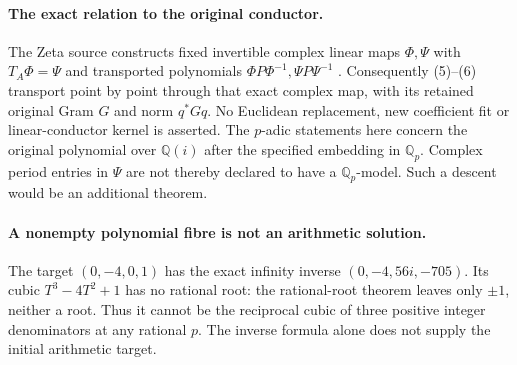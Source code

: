 \paragraph{The exact relation to the original conductor.}
The Zeta source constructs fixed invertible complex linear maps $\Phi,\Psi$
with $T_A\Phi=\Psi$ and transported polynomials
$\Phi P\Phi^{-1},\Psi P\Psi^{-1}$ \cite[FC32--35]{Zeta}.
Consequently (5)--(6) transport point by point through that exact complex map,
with its retained original Gram $G$ and norm $q^*Gq$. No Euclidean replacement,
new coefficient fit or linear-conductor kernel is asserted.
The $p$-adic statements here concern the original polynomial over $\mathbb Q(i)$
after the specified embedding in $\mathbb Q_p$. Complex period entries in
$\Psi$ are not thereby declared to have a $\mathbb Q_p$-model. Such a descent
would be an additional theorem.

\paragraph{A nonempty polynomial fibre is not an arithmetic solution.}
The target $(0,-4,0,1)$ has the exact infinity inverse
$(0,-4,56i,-705)$. Its cubic $T^3-4T^2+1$ has no rational root: the rational-root
theorem leaves only $\pm1$, neither a root. Thus it cannot be the reciprocal
cubic of three positive integer denominators at any rational $p$.
The inverse formula alone does not supply the initial arithmetic target.




